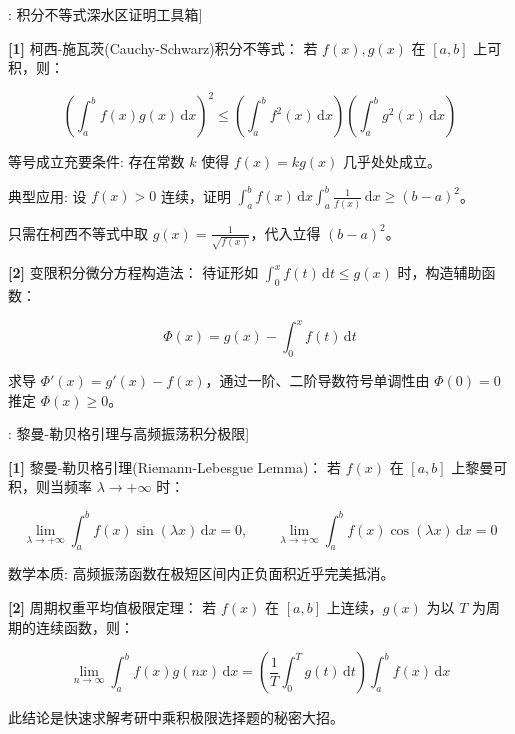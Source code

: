 \documentclass[11pt,a4paper,UTF8]{ctexart}
\begin{document}
\begin{thmbox}[模型[2]: 积分不等式深水区证明工具箱]

\textbf{[1]} 柯西-施瓦茨(Cauchy-Schwarz)积分不等式：
若 $f(x), g(x)$ 在 $[a, b]$ 上可积，则：


\begin{equation*}
\left(\int_a^b f(x)g(x)\,\mathrm{d}x\right)^2 \leqslant \left(\int_a^b f^2(x)\,\mathrm{d}x\right)\left(\int_a^b g^2(x)\,\mathrm{d}x\right)
\end{equation*}


等号成立充要条件: 存在常数 $k$ 使得 $f(x) = k g(x)$ 几乎处处成立。

典型应用: 设 $f(x) > 0$ 连续，证明 $\int_a^b f(x)\,\mathrm{d}x \int_a^b \frac{1}{f(x)}\,\mathrm{d}x \geqslant (b-a)^2$。

只需在柯西不等式中取 $g(x) = \frac{1}{\sqrt{f(x)}}$，代入立得 $(b-a)^2$。

\textbf{[2]} 变限积分微分方程构造法：
待证形如 $\int_0^x f(t)\,\mathrm{d}t \leqslant g(x)$ 时，构造辅助函数：


\begin{equation*}
\Phi(x) = g(x) - \int_0^x f(t)\,\mathrm{d}t
\end{equation*}


求导 $\Phi'(x) = g'(x) - f(x)$，通过一阶、二阶导数符号单调性由 $\Phi(0) = 0$ 推定 $\Phi(x) \geqslant 0$。

\end{thmbox}
\begin{thmbox}[模型[3]: 黎曼-勒贝格引理与高频振荡积分极限]

\textbf{[1]} 黎曼-勒贝格引理(Riemann-Lebesgue Lemma)：
若 $f(x)$ 在 $[a, b]$ 上黎曼可积，则当频率 $\lambda \to +\infty$ 时：


\begin{equation*}
\lim_{\lambda \to +\infty} \int_a^b f(x)\sin(\lambda x)\,\mathrm{d}x = 0, \qquad \lim_{\lambda \to +\infty} \int_a^b f(x)\cos(\lambda x)\,\mathrm{d}x = 0
\end{equation*}


数学本质: 高频振荡函数在极短区间内正负面积近乎完美抵消。

\textbf{[2]} 周期权重平均值极限定理：
若 $f(x)$ 在 $[a, b]$ 上连续，$g(x)$ 为以 $T$ 为周期的连续函数，则：


\begin{equation*}
\lim_{n \to \infty} \int_a^b f(x)g(nx)\,\mathrm{d}x = \left(\frac{1}{T}\int_0^T g(t)\,\mathrm{d}t\right) \int_a^b f(x)\,\mathrm{d}x
\end{equation*}


此结论是快速求解考研中乘积极限选择题的秘密大招。

\end{thmbox}
\end{document}

